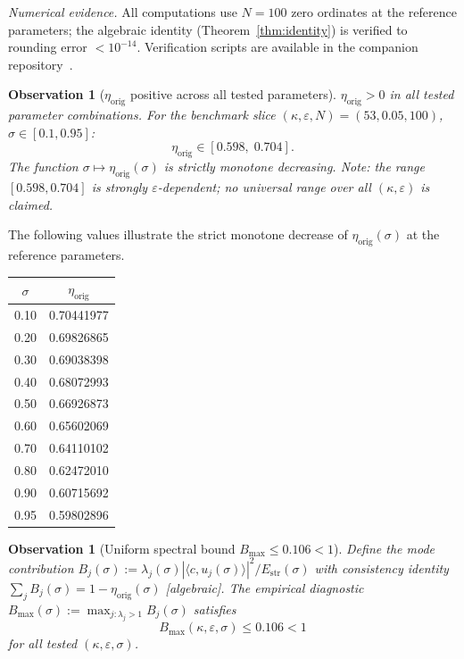 \documentclass[11pt]{article}
\newtheorem{observation}[theorem]{Observation}
\newcommand{\Estr}{E_{\mathrm{str}}}
\newcommand{\etaorig}{\eta_{\mathrm{orig}}}
\begin{document}
\emph{Numerical evidence.}
All computations use $N=100$ zero ordinates at the reference
parameters; the algebraic identity (Theorem~\ref{thm:identity}) is
verified to rounding error $<10^{-14}$. Verification scripts are
available in the companion repository~\cite{Code}.

\begin{observation}[$\etaorig$ positive across all tested parameters]
$\etaorig>0$ in all tested parameter combinations. For the benchmark slice
$(\kappa,\varepsilon,N)=(53,0.05,100)$, $\sigma\in[0.1,0.95]$:
\[
\etaorig\in[0.598,\;0.704].
\]
The function $\sigma\mapsto\etaorig(\sigma)$ is strictly monotone decreasing.
Note: the range $[0.598,0.704]$ is strongly $\varepsilon$-dependent; no
universal range over all $(\kappa,\varepsilon)$ is claimed.
\end{observation}

The following values illustrate the strict monotone decrease of
$\etaorig(\sigma)$ at the reference parameters.

\begin{center}
\begin{tabular}{cc}
\toprule
$\sigma$ & $\etaorig$ \\
\midrule
0.10 & 0.70441977 \\
0.20 & 0.69826865 \\
0.30 & 0.69038398 \\
0.40 & 0.68072993 \\
0.50 & 0.66926873 \\
0.60 & 0.65602069 \\
0.70 & 0.64110102 \\
0.80 & 0.62472010 \\
0.90 & 0.60715692 \\
0.95 & 0.59802896 \\
\bottomrule
\end{tabular}
\end{center}

\begin{observation}[Uniform spectral bound $B_{\max}\leq 0.106<1$]
Define the mode contribution
$B_j(\sigma):=\lambda_j(\sigma)|\langle c,u_j(\sigma)\rangle|^2/\Estr(\sigma)$
with consistency identity $\sum_j B_j(\sigma)=1-\etaorig(\sigma)$ [algebraic].
The empirical diagnostic $B_{\max}(\sigma):=\max_{j:\lambda_j>1}B_j(\sigma)$
satisfies
\[
B_{\max}(\kappa,\varepsilon,\sigma)\leq 0.106<1
\]
for all tested $(\kappa,\varepsilon,\sigma)$.
\end{observation}
\end{document}
